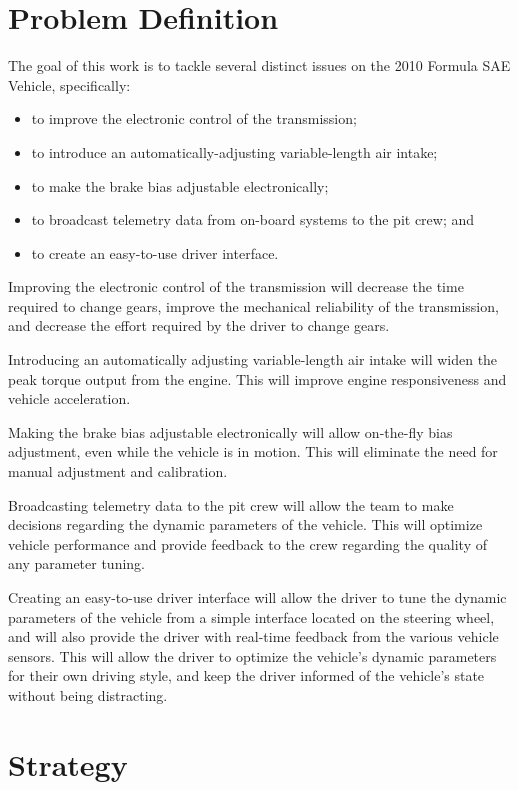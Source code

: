 \section{Problem Definition}

The goal of this work is to tackle several distinct issues on the 2010 Formula SAE Vehicle, specifically:

\begin{itemize}
 \item to improve the electronic control of the transmission;
 \item to introduce an automatically-adjusting variable-length air intake;
 \item to make the brake bias adjustable electronically;
 \item to broadcast telemetry data from on-board systems to the pit crew; and
 \item to create an easy-to-use driver interface.
\end{itemize}

Improving the electronic control of the transmission will decrease the time required to change gears, improve the mechanical reliability of the transmission, and decrease the effort required by the driver to change gears. 

Introducing an automatically adjusting variable-length air intake will widen the peak torque output from the engine. This will improve engine responsiveness and vehicle acceleration.
 
Making the brake bias adjustable electronically will allow on-the-fly bias adjustment, even while the vehicle is in motion. This will eliminate the need for manual adjustment and calibration.
 
Broadcasting telemetry data to the pit crew will allow the team to make decisions regarding the dynamic parameters of the vehicle. This will optimize vehicle performance and provide feedback to the crew regarding the quality of any parameter tuning.

Creating an easy-to-use driver interface will allow the driver to tune the dynamic parameters of the vehicle from a simple interface located on the steering wheel, and will also provide the driver with real-time feedback from the various vehicle sensors. This will allow the driver to optimize the vehicle's dynamic parameters for their own driving style, and keep the driver informed of the vehicle's state without being distracting.
 
\section{Strategy \label{sec:intro_strategy}}

